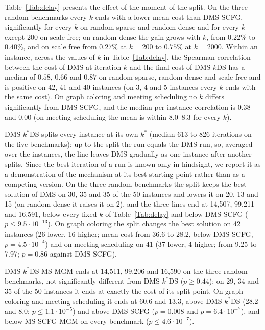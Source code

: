 Table~\ref{Tab:delay} presents the effect of the moment of the split. On the three random benchmarks every $k$ ends with a lower mean cost than DMS-SCFG, significantly for every $k$ on random sparse and random dense and for every $k$ except 200 on scale free; on random dense the gain grows with $k$, from $0.22\%$ to $0.40\%$, and on scale free from $0.27\%$ at $k = 200$ to $0.75\%$ at $k = 2000$. Within an instance, across the values of $k$ in Table~\ref{Tab:delay}, the Spearman correlation between the cost of DMS at iteration $k$ and the final cost of DMS-$k$DS has a median of $0.58$, $0.66$ and $0.87$ on random sparse, random dense and scale free and is positive on 42, 41 and 40 instances (on 3, 4 and 5 instances every $k$ ends with the same cost). On graph coloring and meeting scheduling no $k$ differs significantly from DMS-SCFG, and the median per-instance correlation is $0.38$ and $0.00$ (on meeting scheduling the mean is within $8.0$--$8.3$ for every $k$).

DMS-$k^*$DS splits every instance at its own $k^*$ (median 613 to 826 iterations on the five benchmarks); up to the split the run equals the DMS run, so, averaged over the instances, the line leaves DMS gradually as one instance after another splits. Since the best iteration of a run is known only in hindsight, we report it as a demonstration of the mechanism at its best starting point rather than as a competing version. On the three random benchmarks the split keeps the best solution of DMS on 30, 35 and 35 of the 50 instances and lowers it on 20, 13 and 15 (on random dense it raises it on 2), and the three lines end at 14{,}507, 99{,}211 and 16{,}591, below every fixed $k$ of Table~\ref{Tab:delay} and below DMS-SCFG ($p \le 9.5\cdot 10^{-13}$). On graph coloring the split changes the best solution on 42 instances (26 lower, 16 higher; mean cost from 36.6 to 28.2, below DMS-SCFG, $p = 4.5\cdot 10^{-4}$) and on meeting scheduling on 41 (37 lower, 4 higher; from 9.25 to 7.97; $p = 0.86$ against DMS-SCFG).

DMS-$k^*$DS-MS-MGM ends at 14{,}511, 99{,}206 and 16{,}590 on the three random benchmarks, not significantly different from DMS-$k^*$DS ($p \ge 0.44$); on 29, 34 and 35 of the 50 instances it ends at exactly the cost of its split point. On graph coloring and meeting scheduling it ends at 60.6 and 13.3, above DMS-$k^*$DS (28.2 and 8.0; $p \le 1.1\cdot 10^{-5}$) and above DMS-SCFG ($p = 0.008$ and $p = 6.4\cdot 10^{-7}$), and below MS-SCFG-MGM on every benchmark ($p \le 4.6\cdot 10^{-7}$).

